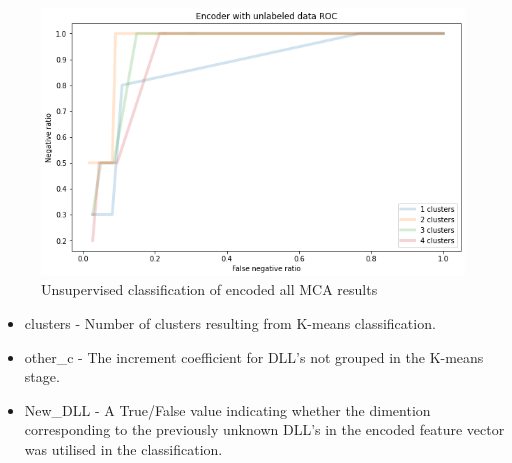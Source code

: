 \documentclass[a4paper,twoside,12pt]{book}
\begin{document}
 \begin{figure}
	\centering
	\includegraphics[scale=0.9]{images/EncROCwoLab}
	\caption{Unsupervised classification of encoded all MCA results}
	\label{fig:EncROCwoLab}
 \end{figure}


\begin{itemize}
	\item clusters - Number of clusters resulting from K-means classification.
	\item other\_c - The increment coefficient for DLL's not grouped in the K-means stage. %
	\item New\_DLL - A True/False value indicating whether the dimention corresponding 
	to the previously unknown DLL's in the encoded feature vector was utilised in the classification.
\end{itemize}
\end{document}
